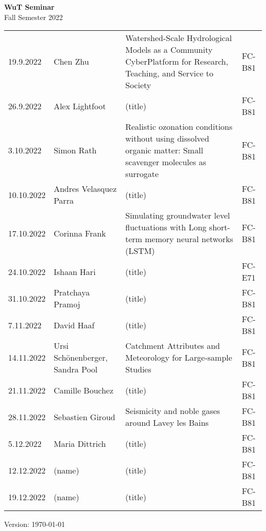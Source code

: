 \documentclass[12pt]{article}
\begin{document}
\centering

{\Huge \bf WuT Seminar}\\[1cm]
{\Large Fall Semester 2022}\\[1.8cm]





\renewcommand*\arraystretch{1.4}
\begin{tabular}{l p{3.8cm} p{8.5cm} p{2cm}}

19.9.2022
 	& Chen Zhu
 	& Watershed-Scale Hydrological Models as a Community CyberPlatform for Research, Teaching, and Service to Society
  & FC-B81\\
  
26.9.2022
 	& Alex Lightfoot
 	& (title)
 	& FC-B81\\

3.10.2022
 	& Simon Rath
 	& Realistic ozonation conditions without using dissolved organic matter: Small scavenger molecules as surrogate
 	& FC-B81\\

10.10.2022
 	& Andres Velasquez Parra
 	& (title)
 	& FC-B81\\

17.10.2022  
 	& Corinna Frank
 	& Simulating groundwater level fluctuations with Long short-term memory neural networks (LSTM)
 	& FC-B81\\
 	
24.10.2022
 	& Ishaan Hari
 	& (title)
 	& FC-E71\\

31.10.2022
 	& Pratchaya Pramoj
 	& (title)
 	& FC-B81\\

7.11.2022
 	& David Haaf
 	& (title)
 	& FC-B81\\

14.11.2022
 	& Ursi Schönenberger, Sandra Pool
 	& Catchment Attributes and Meteorology for Large-sample Studies
 	& FC-B81\\

21.11.2022
 	& Camille Bouchez
 	& (title)
 	& FC-B81\\

28.11.2022
 	& Sebastien Giroud
 	& Seismicity and noble gases around Lavey les Bains
 	& FC-B81\\

5.12.2022
 	& Maria Dittrich
 	& (title)
 	& FC-B81\\

12.12.2022
 	& (name)
 	& (title)
 	& FC-B81\\

19.12.2022
 	& (name)
 	& (title)
 	& FC-B81\\


\end{tabular}

\vfill

{\scriptsize Version: \today}
\end{document}
